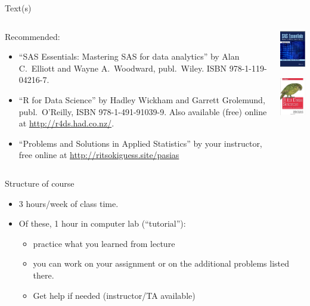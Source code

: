 \documentclass[ignorenonframetext,]{beamer}
\providecommand{\tightlist}{%
  \setlength{\itemsep}{0pt}\setlength{\parskip}{0pt}}
\begin{document}
\begin{frame}{Text(s)}
\protect\hypertarget{texts}{}

\begin{columns}
    \begin{column}{0.7\textwidth}
Recommended:
  \begin{itemize}
\item ``SAS Essentials: Mastering SAS for data analytics'' by Alan C.\
  Elliott and Wayne A.\ Woodward, publ.\ Wiley. ISBN 978-1-119-04216-7.
\item ``R for Data Science'' by Hadley Wickham and Garrett Grolemund,
  publ.\ O'Reilly, ISBN 978-1-491-91039-9. Also available (free)
  online at \url{http://r4ds.had.co.nz/}.
  \item ``Problems and Solutions in Applied Statistics'' by your instructor, free online at \url{http://ritsokiguess.site/pasias}
\end{itemize}
    \end{column}
    \begin{column}{0.3\textwidth}
      \includegraphics[width=1in]{Screenshot_2018-08-17_12-24-26.png}

      \includegraphics[width=1in]{r4ds}
    \end{column}
  \end{columns}

\end{frame}

\begin{frame}{Structure of course}
\protect\hypertarget{structure-of-course}{}

\begin{itemize}
\tightlist
\item
  3 hours/week of class time.
\item
  Of these, 1 hour in computer lab (``tutorial''):

  \begin{itemize}
  \tightlist
  \item
    practice what you learned from lecture
  \item
    you can work on your assignment or on the additional problems listed
    there.
  \item
    Get help if needed (instructor/TA available)
  \end{itemize}
\end{itemize}

\end{frame}
\end{document}
